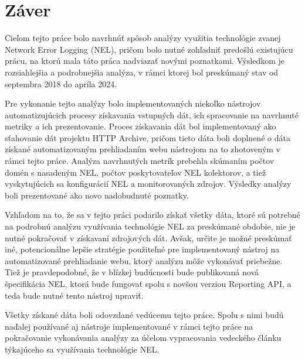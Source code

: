 \chapter{Záver}
\label{zaver}

Cieľom tejto práce bolo navrhnúť spôsob analýzy využitia technológie zvanej Network Error Logging (NEL), pričom bolo nutné zohľadniť predošlú existujúcu prácu, na ktorú mala táto práca nadviazať novými poznatkami.
Výsledkom je rozsiahlejšia a podrobnejšia analýza, v rámci ktorej bol preskúmaný stav od septembra 2018 do apríla 2024.

Pre vykonanie tejto analýzy bolo implementovaných niekoľko nástrojov automatizujúcich procesy získavania vstupných dát, ich spracovanie na navrhnuté metriky a ich prezentovanie.
Proces získavania dát bol implementovaný ako sťahovanie dát projektu HTTP Archive, pričom tieto dáta boli doplnené o dáta získané automatizovaným prehliadaním webu nástrojom na to zhotoveným v rámci tejto práce. 
Analýza navrhnutých metrík prebehla skúmaním počtov domén s nasadeným NEL, počtov poskytovateľov NEL kolektorov, a tiež vyskytujúcich sa konfigurácií NEL a monitorovaných zdrojov.
Výsledky analýzy boli prezentované ako novo nadobudnuté poznatky.

Vzhľadom na to, že sa v tejto práci podarilo získať všetky dáta, ktoré sú potrebné na podrobnú analýzu využívania technológie NEL za preskúmané obdobie, nie je nutné pokračovať v získavaní zdrojových dát.
Avšak, určite je možné preskúmať iné, potencionálne lepšie stratégie použiteľné pre implementovaný nástroj na automatizované prehliadanie webu, ktorý analýzu môže vykonávať priebežne.
Tiež je pravdepodobné, že v blízkej budúcnosti bude publikovaná nová špecifikácia NEL, ktorá bude fungovať spolu s novšou verziou Reporting API, a teda bude nutné tento nástroj upraviť.

Všetky získané dáta boli odovzdané vedúcemu tejto práce.
Spolu s nimi budú naďalej používané aj nástroje implementované v rámci tejto práce na pokračovanie vykonávania analýzy za účelom vypracovania vedeckého článku týkajúceho sa využívania technológie NEL. 
